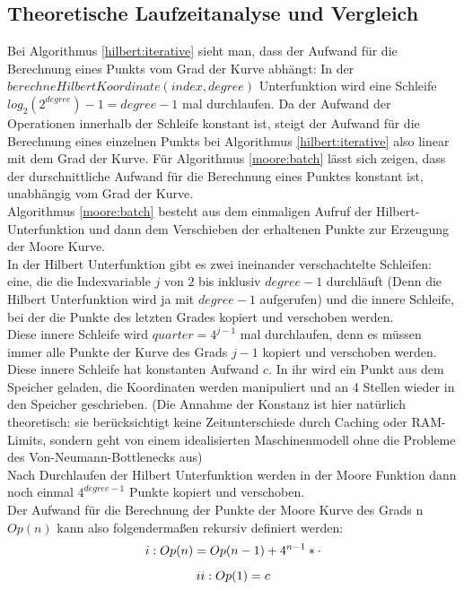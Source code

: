 \documentclass[course=erap]{aspdoc}
\newcommand{\uproman}[1]{\uppercase\expandafter{\romannumeral#1}}
\begin{document}
\subsection{Theoretische Laufzeitanalyse und Vergleich}
Bei Algorithmus \ref{hilbert:iterative} sieht man, dass der Aufwand für die Berechnung eines Punkts vom Grad der Kurve abhängt: In der $berechneHilbertKoordinate(index, degree)$ Unterfunktion wird eine Schleife $log_2(2^{degree})-1 = degree -1$ mal durchlaufen. Da der Aufwand der Operationen innerhalb der Schleife konstant ist, steigt der Aufwand für die Berechnung eines einzelnen Punkts bei Algorithmus \ref{hilbert:iterative} also linear mit dem Grad der Kurve.
\newline
Für Algorithmus \ref{moore:batch} lässt sich zeigen, dass der durschnittliche Aufwand für die Berechnung eines Punktes konstant ist, unabhängig vom Grad der Kurve. \\
Algorithmus \ref{moore:batch} besteht aus dem einmaligen Aufruf der Hilbert-Unterfunktion und dann dem Verschieben der erhaltenen Punkte zur Erzeugung der Moore Kurve. \\
In der Hilbert Unterfunktion gibt es zwei ineinander verschachtelte Schleifen: eine, die die Indexvariable $j$ von $2$ bis inklusiv  $degree -1$ durchläuft (Denn die Hilbert Unterfunktion wird ja mit $degree-1$ aufgerufen) und die innere Schleife, bei der die Punkte des letzten Grades kopiert und verschoben werden. \\ 
Diese innere Schleife wird $quarter = 4^{j-1}$ mal durchlaufen, denn es müssen immer alle Punkte der Kurve des Grads $j-1$ kopiert und verschoben werden. Diese innere Schleife hat konstanten Aufwand $c$. In ihr wird ein Punkt aus dem Speicher  geladen, die Koordinaten werden manipuliert und an 4 Stellen wieder in den Speicher geschrieben. (Die Annahme der Konstanz ist hier natürlich theoretisch: sie berücksichtigt keine Zeitunterschiede durch Caching oder RAM-Limits, sondern geht von einem idealisierten Maschinenmodell ohne die Probleme des Von-Neumann-Bottlenecks aus)\\
Nach Durchlaufen der Hilbert Unterfunktion werden in der Moore Funktion dann noch einmal  $4^{degree-1}$ Punkte kopiert und verschoben. \\ Der Aufwand für die Berechnung der Punkte der Moore Kurve des Grads n $Op(n)$ kann also folgendermaßen rekursiv definiert werden: \ \\
\[\uproman{1}: Op(n) = Op(n-1) + 4^{n-1}*\cdot\]
\[\uproman{2}: Op(1) = c\] \ \\ 
\end{document}
